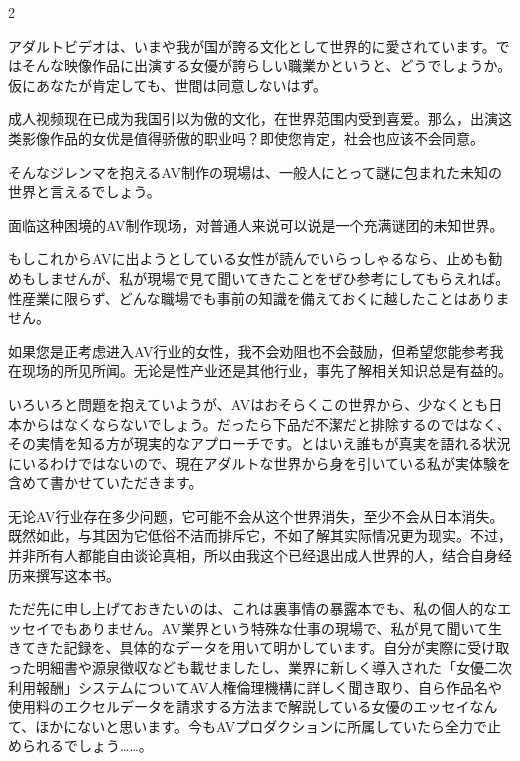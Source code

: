 \documentclass[12pt,UTF8]{ctexbook}
\begin{document}
\begin{paracol}{2}
\switchcolumn*

アダルトビデオは、いまや我が国が誇る文化として世界的に愛されています。ではそんな映像作品に出演する女優が誇らしい職業かというと、どうでしょうか。仮にあなたが肯定しても、世間は同意しないはず。

\switchcolumn

成人视频现在已成为我国引以为傲的文化，在世界范围内受到喜爱。那么，出演这类影像作品的女优是值得骄傲的职业吗？即使您肯定，社会也应该不会同意。

\switchcolumn*

そんなジレンマを抱えるAV制作の現場は、一般人にとって謎に包まれた未知の世界と言えるでしょう。

\switchcolumn

面临这种困境的AV制作现场，对普通人来说可以说是一个充满谜团的未知世界。

\switchcolumn*

もしこれからAVに出ようとしている女性が読んでいらっしゃるなら、止めも勧めもしませんが、私が現場で見て聞いてきたことをぜひ参考にしてもらえれば。性産業に限らず、どんな職場でも事前の知識を備えておくに越したことはありません。

\switchcolumn

如果您是正考虑进入AV行业的女性，我不会劝阻也不会鼓励，但希望您能参考我在现场的所见所闻。无论是性产业还是其他行业，事先了解相关知识总是有益的。

\switchcolumn*

いろいろと問題を抱えていようが、AVはおそらくこの世界から、少なくとも日本からはなくならないでしょう。だったら下品だ不潔だと排除するのではなく、その実情を知る方が現実的なアプローチです。とはいえ誰もが真実を語れる状況にいるわけではないので、現在アダルトな世界から身を引いている私が実体験を含めて書かせていただきます。

\switchcolumn

无论AV行业存在多少问题，它可能不会从这个世界消失，至少不会从日本消失。既然如此，与其因为它低俗不洁而排斥它，不如了解其实际情况更为现实。不过，并非所有人都能自由谈论真相，所以由我这个已经退出成人世界的人，结合自身经历来撰写这本书。

\switchcolumn*

ただ先に申し上げておきたいのは、これは裏事情の暴露本でも、私の個人的なエッセイでもありません。AV業界という特殊な仕事の現場で、私が見て聞いて生きてきた記録を、具体的なデータを用いて明かしています。自分が実際に受け取った明細書や源泉徴収なども載せましたし、業界に新しく導入された「女優二次利用報酬」システムについてAV人権倫理機構に詳しく聞き取り、自ら作品名や使用料のエクセルデータを請求する方法まで解説している女優のエッセイなんて、ほかにないと思います。今もAVプロダクションに所属していたら全力で止められるでしょう……。


\end{paracol}
\end{document}
